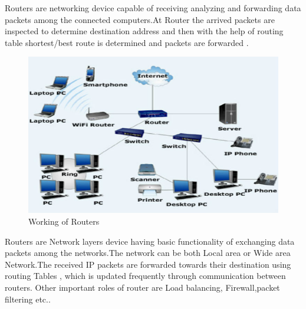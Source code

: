 \documentclass[a4paper,12pt]{article}
\begin{document}
\begin{A}
      {
            Routers are networking device capable of receiving analyzing and forwarding data packets among the connected computers.At Router the arrived packets are inspected to determine destination address and then with the help of routing table shortest/best route is determined and packets are forwarded .
            \begin{figure}[H]
                  \centering
                  \includegraphics[scale=0.4,cframe=blue 0.5pt 3pt]{Working of Router.jpg}
                  \caption{Working of Routers}
            \end{figure}
            Routers are Network layers device having basic functionality of exchanging data packets among the networks.The network can be both  Local area or Wide area Network.The received IP packets are forwarded towards their destination using routing Tables , which is updated frequently through communication between routers. Other important roles of router are Load balancing, Firewall,packet filtering etc..
      }
\end{A}


\end{document}
